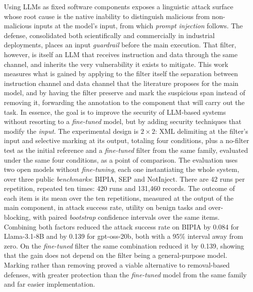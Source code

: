 Using LLMs as fixed software components exposes a linguistic attack surface
whose root cause is the native inability to distinguish malicious from
non-malicious inputs at the model's input, from which \textit{prompt injection}
follows. The defense, consolidated both scientifically and commercially in
industrial deployments, places an input \textit{guardrail} before the main
execution. That filter, however, is itself an LLM that receives instruction and
data through the same channel, and inherits the very vulnerability it exists to
mitigate. This work measures what is gained by applying to the filter itself
the separation between instruction channel and data channel that the literature
proposes for the main model, and by having the filter preserve and mark the
suspicious span instead of removing it, forwarding the annotation to the
component that will carry out the task. In essence, the goal is to improve the
security of LLM-based systems without resorting to a \textit{fine-tuned} model,
but by adding security techniques that modify the \textit{input}. The
experimental design is $2 \times 2$: XML delimiting at the filter's input and
selective marking at its output, totaling four conditions, plus a no-filter
test as the initial reference and a \textit{fine-tuned} filter from the same
family, evaluated under the same four conditions, as a point of comparison. The
evaluation uses two open models
without \textit{fine-tuning}, each one instantiating the whole system, over
three public \textit{benchmarks}: BIPIA, SEP and NotInject. There are 42 runs
per repetition, repeated ten times: 420 runs and 131,460 records. The outcome
of each item is its mean over the ten repetitions, measured at the output of
the main component, in attack success rate, utility on benign tasks and
over-blocking, with paired \textit{bootstrap} confidence intervals over the
same items. Combining both factors reduced the attack success rate on
BIPIA by 0.084 for Llama-3.1-8B and by 0.139 for gpt-oss-20b, both with a 95\%
interval away from zero. On the \textit{fine-tuned} filter the same
combination reduced it by 0.139, showing that the gain does not depend on the
filter being a general-purpose model. Marking rather than removing proved a
viable alternative to removal-based defenses, with greater protection than the
\textit{fine-tuned} model from the same family and far easier implementation.
